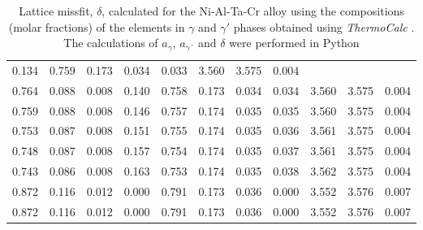 \begin{table}[H]
\begin{tabular}{rrrrrrrrrrr}
0.134 & 0.759 & 0.173 & 0.034 & 0.033 & 3.560 & 3.575 & 0.004 \\0.764 & 0.088 & 0.008 & 0.140 & 0.758 & 0.173 & 0.034 & 0.034 & 3.560 & 3.575 & 0.004 \\0.759 & 0.088 & 0.008 & 0.146 & 0.757 & 0.174 & 0.035 & 0.035 & 3.560 & 3.575 & 0.004 \\0.753 & 0.087 & 0.008 & 0.151 & 0.755 & 0.174 & 0.035 & 0.036 & 3.561 & 3.575 & 0.004 \\0.748 & 0.087 & 0.008 & 0.157 & 0.754 & 0.174 & 0.035 & 0.037 & 3.561 & 3.575 & 0.004 \\0.743 & 0.086 & 0.008 & 0.163 & 0.753 & 0.174 & 0.035 & 0.038 & 3.562 & 3.575 & 0.004 \\0.872 & 0.116 & 0.012 & 0.000 & 0.791 & 0.173 & 0.036 & 0.000 & 3.552 & 3.576 & 0.007 \\0.872 & 0.116 & 0.012 & 0.000 & 0.791 & 0.173 & 0.036 & 0.000 & 3.552 & 3.576 & 0.007
    \end{tabular}
    \caption{Lattice missfit, $\delta$, calculated for the Ni-Al-Ta-Cr alloy using the compositions (molar fractions) of the elements in $\gamma$ and $\gamma'$ phases obtained using \textit{ThermoCalc} \citep{thermocalc}. The calculations of $a_\gamma$, $a_{\gamma´}$ and $\delta$ were performed in Python \citep{mygit}}
    \label{tab:tab08}
\end{table}


